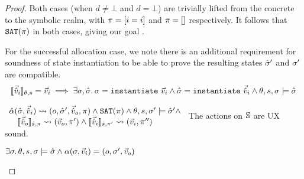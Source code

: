 \begin{proof}
\pfcase{$\alpha=\alloc$}

Both cases (when $d\neq\bot$ and $d=\bot$) are trivially lifted from the concrete to the symbolic realm, with $\pc=[i=i]$ and $\pc=[]$ respectively. It follows that $\SAT(\pc)$ in both cases, giving our goal .

For the successful allocation case, we note there is an additional requirement for soundness of state instantiation to be able to prove the resulting states $\sst'$ and $\st'$ are compatible.
\begin{align*}
	\expeval{\sins}=\ins \implies \exists \st,\sst\ldotp \st=\code{instantiate}~\ins \land \sst=\code{instantiate}~\sins \land \theta,s,\st\models\sst
\end{align*}


\pfassume \begin{hypvlist}
 $
\begin{array}{l}
\ppexec{\hat\alpha}{\sst,\sins}{o,\sst',\souts, \pc} \land \SAT(\pc) \land \theta,s,\st'\models\sst' \land \\
\quad \expeval[\hat s,\pc]{\souts}\rightsquigarrow(\outs,\pc')\land \expeval[\hat s,\pc']{\sins}\rightsquigarrow(\ins,\pc'')
\end{array}
$
 The actions on $\mmdl$ are UX sound.
\end{hypvlist}
\pfprove \begin{goalvlist}
 $\exists \st\ldotp \theta,s,\st\models\sst \land \ppexecc{\alpha}{\st,\ins}{o,\st',\outs}$
\end{goalvlist}

\pfcase{$\alpha\in\actions_\mmdl$}


\end{proof}
